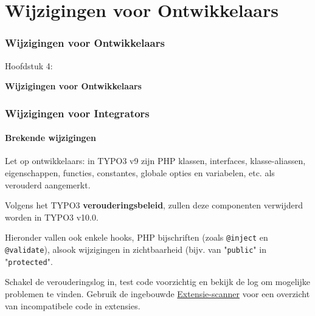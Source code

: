 %

\section{Wijzigingen voor Ontwikkelaars}
\begin{frame}[fragile]
	\frametitle{Wijzigingen voor Ontwikkelaars}

	\begin{center}\huge{Hoofdstuk 4:}\end{center}
	\begin{center}\huge{\color{typo3darkgrey}\textbf{Wijzigingen voor Ontwikkelaars}}\end{center}

\end{frame}


\begin{frame}[fragile]
	\frametitle{Wijzigingen voor Integrators}
	\framesubtitle{Brekende wijzigingen}

	\small
		Let op ontwikkelaars: in TYPO3 v9 zijn PHP klassen, interfaces, klasse-aliassen,
		eigenschappen, functies, constantes, globale opties en variabelen, etc. als
		verouderd aangemerkt.

		\vspace{0.2cm}

		Volgens het TYPO3 \textbf{verouderingsbeleid}, zullen deze componenten verwijderd
		worden in TYPO3 v10.0.

		\vspace{0.2cm}

		Hieronder vallen ook enkele hooks, PHP bijschriften (zoals \texttt{@inject} en
		\texttt{@validate}), alsook wijzigingen in zichtbaarheid (bijv. van "\texttt{public}"
		in "\texttt{protected}".

		\vspace{0.2cm}

		Schakel de verouderingslog in, test code voorzichtig en bekijk de log om mogelijke
		problemen te vinden. Gebruik de ingebouwde
		\href{https://docs.typo3.org/m/typo3/reference-coreapi/master/en-us/ApiOverview/ExtensionScanner/Index.html}{Extensie-scanner}
		voor een overzicht van incompatibele code in extensies.

	\normalsize

\end{frame}

